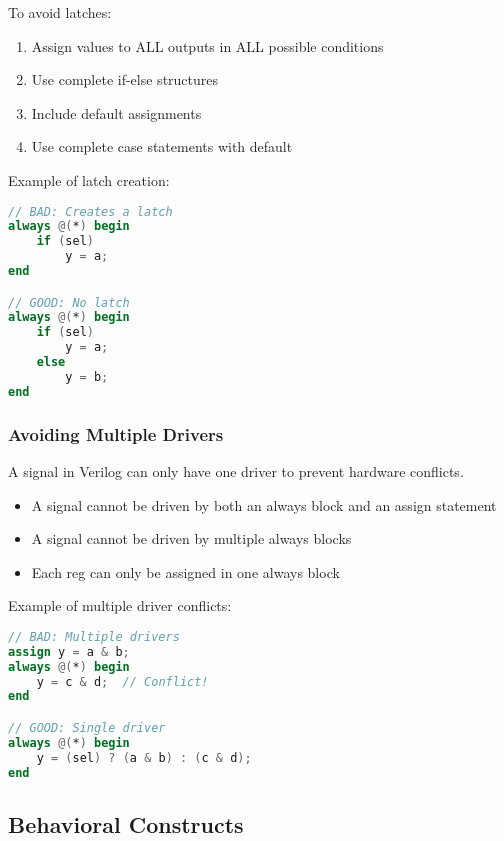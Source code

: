 \documentclass[12pt]{labmanual}
\begin{document}
\begin{important}[frametitle={Latch Prevention}]
To avoid latches:
\begin{enumerate}
    \item Assign values to ALL outputs in ALL possible conditions
    \item Use complete if-else structures
    \item Include default assignments
    \item Use complete case statements with default
\end{enumerate}
\end{important}

Example of latch creation:
\begin{lstlisting}[language=verilog]
// BAD: Creates a latch
always @(*) begin
    if (sel) 
        y = a;
end

// GOOD: No latch
always @(*) begin
    if (sel)
        y = a;
    else
        y = b;
end
\end{lstlisting}

\subsubsection{Avoiding Multiple Drivers}

A signal in Verilog can only have one driver to prevent hardware conflicts.

\begin{important}[frametitle={Multiple Driver Rules}]
\begin{itemize}
    \item A signal cannot be driven by both an always block and an assign statement
    \item A signal cannot be driven by multiple always blocks
    \item Each reg can only be assigned in one always block
\end{itemize}
\end{important}

Example of multiple driver conflicts:
\begin{lstlisting}[language=verilog]
// BAD: Multiple drivers
assign y = a & b;
always @(*) begin
    y = c & d;  // Conflict!
end

// GOOD: Single driver
always @(*) begin
    y = (sel) ? (a & b) : (c & d);
end
\end{lstlisting}

\subsection{Behavioral Constructs}
\end{document}
